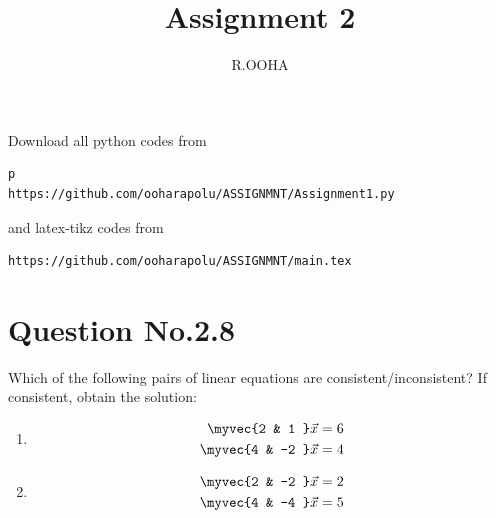\documentclass[journal,12pt,twocolumn]{IEEEtran}
\begin{document}
     \def\rightbox#1{\makebox[0in][r]{#1}}
     \def\centbox#1{\makebox[0in]{#1}}
     \def\topbox#1{\raisebox{-\baselineskip}[0in][0in]{#1}}
     \def\midbox#1{\raisebox{-0.5\baselineskip}[0in][0in]{#1}}
\vspace{3cm}
\title{Assignment 2}
\author{R.OOHA}
\maketitle
\newpage
\bigskip
\renewcommand{\thefigure}{\theenumi}
\renewcommand{\thetable}{\theenumi}
Download all python codes from 
\begin{lstlisting}p
https://github.com/ooharapolu/ASSIGNMNT/Assignment1.py
\end{lstlisting}
%
and latex-tikz codes from 
%
\begin{lstlisting}
https://github.com/ooharapolu/ASSIGNMNT/main.tex
\end{lstlisting}
%
\section{Question No.2.8}
\item Which of the following pairs of linear equations are consistent/inconsistent? If consistent, obtain the solution:
%
\begin{enumerate}[itemsep=2pt]
\item
\begin{align}
\begin{split}
\myvec{2 & 1 }\vec{x}&=6
\\
\myvec{4 & -2 }\vec{x}&=4
\end{split}
\end{align}
\item
\begin{align}
\begin{split}
\myvec{2 & -2 }\vec{x}&=2
\\
\myvec{4 & -4 }\vec{x}&=5
\end{split}
\end{align}
\end{enumerate}
\end{document}
